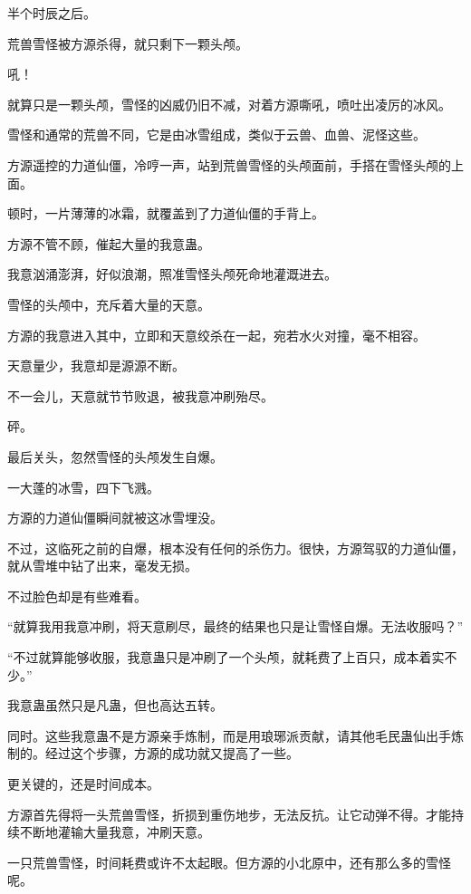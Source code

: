 
\begin{this_body}



半个时辰之后。

荒兽雪怪被方源杀得，就只剩下一颗头颅。

吼！

就算只是一颗头颅，雪怪的凶威仍旧不减，对着方源嘶吼，喷吐出凌厉的冰风。

雪怪和通常的荒兽不同，它是由冰雪组成，类似于云兽、血兽、泥怪这些。

方源遥控的力道仙僵，冷哼一声，站到荒兽雪怪的头颅面前，手搭在雪怪头颅的上面。

顿时，一片薄薄的冰霜，就覆盖到了力道仙僵的手背上。

方源不管不顾，催起大量的我意蛊。

我意汹涌澎湃，好似浪潮，照准雪怪头颅死命地灌溉进去。

雪怪的头颅中，充斥着大量的天意。

方源的我意进入其中，立即和天意绞杀在一起，宛若水火对撞，毫不相容。

天意量少，我意却是源源不断。

不一会儿，天意就节节败退，被我意冲刷殆尽。

砰。

最后关头，忽然雪怪的头颅发生自爆。

一大蓬的冰雪，四下飞溅。

方源的力道仙僵瞬间就被这冰雪埋没。

不过，这临死之前的自爆，根本没有任何的杀伤力。很快，方源驾驭的力道仙僵，就从雪堆中钻了出来，毫发无损。

不过脸色却是有些难看。

“就算我用我意冲刷，将天意刷尽，最终的结果也只是让雪怪自爆。无法收服吗？”

“不过就算能够收服，我意蛊只是冲刷了一个头颅，就耗费了上百只，成本着实不少。”

我意蛊虽然只是凡蛊，但也高达五转。

同时。这些我意蛊不是方源亲手炼制，而是用琅琊派贡献，请其他毛民蛊仙出手炼制的。经过这个步骤，方源的成功就又提高了一些。

更关键的，还是时间成本。

方源首先得将一头荒兽雪怪，折损到重伤地步，无法反抗。让它动弹不得。才能持续不断地灌输大量我意，冲刷天意。

一只荒兽雪怪，时间耗费或许不太起眼。但方源的小北原中，还有那么多的雪怪呢。


\end{this_body}
